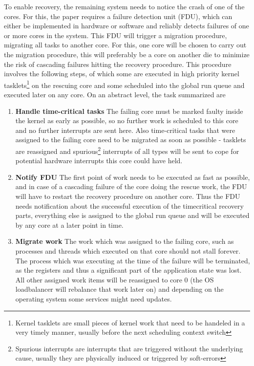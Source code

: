 \documentclass[a4paper,10pt,twoside]{article}
\begin{document}
To enable recovery, the remaining system needs to notice the crash of one of the cores. For this, the paper requires a failure detection unit (FDU), which can either be implemented in hardware or software and reliably detects failures of one or more cores in the system. This FDU will trigger a migration procedure, migrating all tasks to another core. For this, one core will be chosen to carry out the migration procedure, this will preferably be a core on another die to minimize the risk of cascading failures hitting the recovery procedure. %
This procedure involves the following steps, of which some are executed in high priority kernel tasklets\footnote{Kernel tasklets are small pieces of kernel work that need to be handeled in a very timely manner, usually before the next scheduling context switch} on the rescuing core and some scheduled into the global run queue and executed later on any core. On an abstract level, the task summarized are
\begin{enumerate}
	\item \textbf{Handle time-critical tasks} The failing core must be marked faulty inside the kernel as early as possible, so no further work is scheduled to this core and no further interrupts are sent here. Also time-critical tasks that were assigned to the failing core need to be migrated as soon as possible - tasklets are reassigned and spurious\footnote{Spurious interrupts are interrupts that are triggered without the underlying cause, usually they are physically induced or triggered by soft-errors} interrupts of all types will be sent to cope for potential hardware interrupts this core could have held.
	\item \textbf{Notify FDU} The first point of work needs to be executed as fast as possible, and in case of a cascading failure of the core doing the rescue work, the FDU will have to restart the recovery procedure on another core. Thus the FDU needs notification about the successful execution of the timecritical recovery parts, everything else is assigned to the global run queue and will be executed by any core at a later point in time.
	\item \textbf{Migrate work} The work which was assigned to the failing core, such as processes and threads which executed on that core should not stall forever. The process which was executing at the time of the failure will be terminated, as the registers and thus a significant part of the application state was lost. All other assigned work items will be reassigned to core 0 (the OS loadbalancer will rebalance that work later on) and depending on the operating system some services might need updates.
\end{enumerate}
\end{document}
